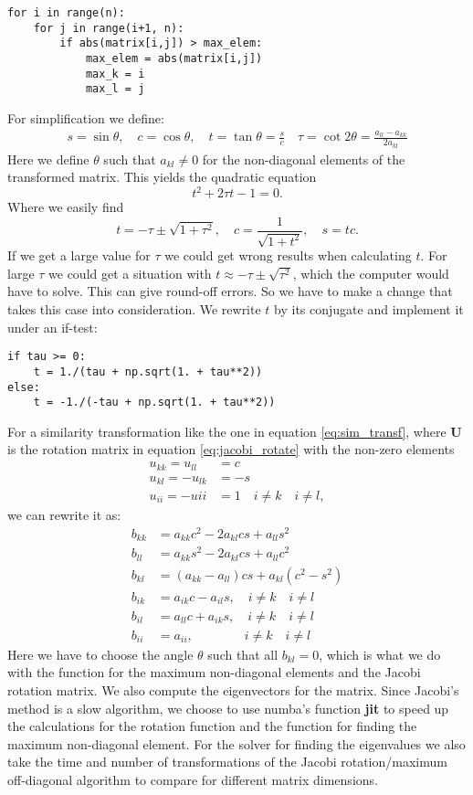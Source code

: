 \documentclass[12pt,a4paper,english]{article}
\begin{document}
\begin{lstlisting}
for i in range(n):
	for j in range(i+1, n):
		if abs(matrix[i,j]) > max_elem:
			max_elem = abs(matrix[i,j])
			max_k = i
			max_l = j
\end{lstlisting}
For simplification we define:
\begin{align*}
s = \sin\theta,\quad c=\cos\theta, \quad t=\tan\theta=\frac{s}{c}\quad \tau=\cot2\theta=\frac{a_{ll}-a_{kk}}{2a_{kl}}
\end{align*}
Here we define $\theta$ such that $a_{kl}\neq0$ for the non-diagonal elements of the transformed matrix. This yields the quadratic equation
\[t^2+2\tau t-1=0.\]
Where we easily find
\[t=-\tau\pm\sqrt{1+\tau^2},\quad c=\frac{1}{\sqrt{1+t^2}},\quad s=tc.\]
If we get a large value for $\tau$ we could get wrong results when calculating $t$. For large $\tau$ we could get a situation with $t\approx-\tau\pm\sqrt{\tau^2}$, which the computer would have to solve. This can give round-off errors. So we have to make a change that takes this case into consideration. We rewrite $t$ by its conjugate and implement it under an if-test:
\begin{lstlisting}
if tau >= 0:
	t = 1./(tau + np.sqrt(1. + tau**2))
else:
	t = -1./(-tau + np.sqrt(1. + tau**2))
\end{lstlisting}
For a similarity transformation like the one in equation \ref{eq:sim_transf}, where \textbf{U} is the rotation matrix in equation \ref{eq:jacobi_rotate} with the non-zero elements 
\begin{align*}
u_{kk} = u_{ll} &= c\\
u_{kl} = -u_{lk} &= -s\\
u_{ii} = -u{ii} &= 1\quad i\neq k\quad i\neq l,
\end{align*}
we can rewrite it as:
\begin{align*}
b_{kk} &= a_{kk} c^2 - 2a_{kl}cs + a_{ll} s^2\\
b_{ll} &= a_{kk} s^2 - 2a_{kl}cs + a_{ll} c^2\\
b_{kl} &= (a_{kk} - a_{ll})cs + a_{kl}(c^2-s^2)\\
b_{ik} &= a_{ik}c - a_{il}s, \quad i\neq k\quad i\neq l\\
b_{il} &= a_{ll}c + a_{ik}s, \quad i\neq k\quad i\neq l\\
b_{ii} &= a_{ii}, \qquad \qquad i\neq k\quad i\neq l
\end{align*}
Here we have to choose the angle $\theta$ such that all $b_{kl}=0$, which is what we do with the function for the maximum non-diagonal elements and the Jacobi rotation matrix. We also compute the eigenvectors for the matrix. Since Jacobi's method is a slow algorithm, we choose to use numba's function \textbf{jit} to speed up the calculations for the rotation function and the function for finding the maximum non-diagonal element. For the solver for finding the eigenvalues we also take the time and number of transformations of the Jacobi rotation/maximum off-diagonal algorithm to compare for different matrix dimensions.
\end{document}
